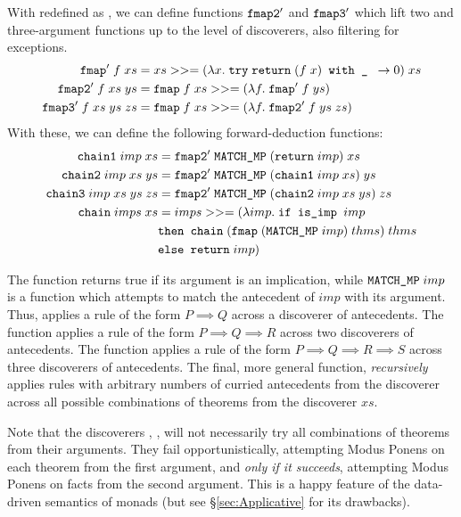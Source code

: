 With  redefined as , we can define functions $\texttt{fmap2}'$ and $\texttt{fmap3}'$ which lift two and three-argument functions up to the level of discoverers, also filtering for exceptions.
\begin{align*}
\texttt{fmap}'\;f\;xs &= xs >>= (\lambda x.\;\texttt{try}\; \texttt{return}\;(f\;x)  \texttt{ with \_ } \rightarrow 0)\;xs\\
\texttt{fmap2}'\;f\;xs\;ys &= \texttt{fmap}\;f\;xs >>= (\lambda f.\;\texttt{fmap}'\;f\;ys)\\
\texttt{fmap3}'\;f\;xs\;ys\;zs &= \texttt{fmap}\;f\;xs >>= (\lambda f.\;\texttt{fmap2}'\;f\;ys\;zs)
\end{align*}
With these, we can define the following forward-deduction functions:
\begin{align*}
\texttt{chain1}\;imp\;xs &= \texttt{fmap2}'\; \texttt{MATCH\_MP}\; (\texttt{return}\;imp)\;xs \\
\texttt{chain2}\;imp\;xs\;ys &= \texttt{fmap2}'\; \texttt{MATCH\_MP}\; (\texttt{chain1}\; imp\;xs)\;ys\\
\texttt{chain3}\;imp\;xs\;ys\;zs &= \texttt{fmap2}'\; \texttt{MATCH\_MP}\; (\texttt{chain2}\;imp\;xs\;ys)\;zs\\
\texttt{chain}\;imps\;xs &= imps >>= (\lambda imp.\;\texttt{if is\_imp } imp\\ &\texttt{then } \texttt{chain}\;(\texttt{fmap}\;(\texttt{MATCH\_MP}\;imp)\;thms)\;thms\\
&\texttt{else } \texttt{return}\; imp)
\end{align*}

The function  returns true if its argument is an implication, while $\texttt{MATCH\_MP}\;imp$ is a function which attempts to match the antecedent of $imp$ with its argument. Thus,  applies a rule of the form $P \implies Q$ across a discoverer of antecedents. The function  applies a rule of the form $P \implies Q \implies R$ across two discoverers of antecedents. The function  applies a rule of the form $P \implies Q \implies R \implies S$ across three discoverers of antecedents. The final, more general function, \emph{recursively} applies rules with arbitrary numbers of curried antecedents from the discoverer  across all possible combinations of theorems from the discoverer $xs$.%

Note that the discoverers , ,  will not necessarily try all combinations of theorems from their arguments. They fail opportunistically, attempting Modus Ponens on each theorem from the first argument, and \emph{only if it succeeds}, attempting Modus Ponens on facts from the second argument. This is a happy feature of the data-driven semantics of monads (but see \S\ref{sec:Applicative} for its drawbacks). 

